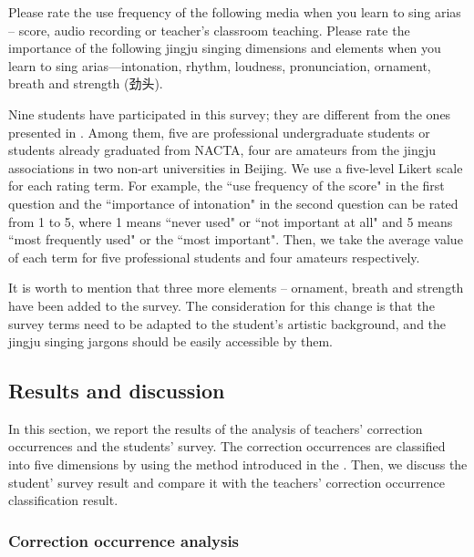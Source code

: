 Please rate the use frequency of the following media when you learn to sing arias -- score, audio recording or teacher's classroom teaching. 
Please rate the importance of the following jingju singing dimensions and elements when you learn to sing arias—intonation, rhythm, loudness, pronunciation, ornament, breath and strength (劲头). 

Nine students have participated in this survey; they are different from the ones presented in . Among them, five are professional undergraduate students or students already graduated from NACTA, four are amateurs from the jingju associations in two non-art universities in Beijing. We use a five-level Likert scale for each rating term. For example, the ``use frequency of the score" in the first question and the ``importance of intonation" in the second question can be rated from 1 to 5, where 1 means ``never used" or ``not important at all" and 5 means ``most frequently used" or the ``most important". Then, we take the average value of each term for five professional students and four amateurs respectively. 

It is worth to mention that three more elements -- ornament, breath and strength have been added to the survey. The consideration for this change is that the survey terms need to be adapted to the student's artistic background, and the jingju singing jargons should be easily accessible by them.

\subsection{Results and discussion}

In this section, we report the results of the analysis of teachers' correction occurrences and the students' survey. The correction occurrences are classified into five dimensions by using the method introduced in the . Then, we discuss the student' survey result and compare it with the teachers' correction occurrence classification result.

\subsubsection{Correction occurrence analysis}\label{sec:ch3:correction_occurrence_results}

